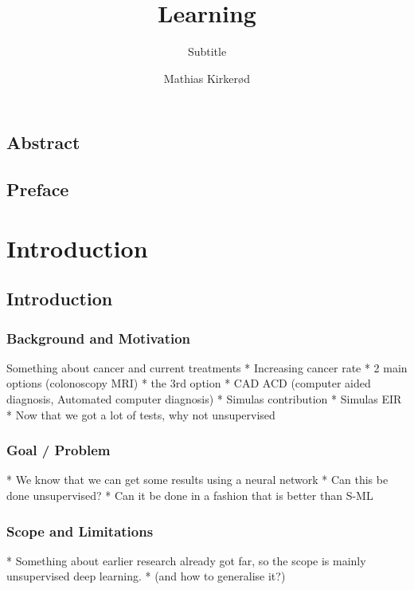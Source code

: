 \documentclass[a4paper,english]{ifimaster}
\title{Learning}
\subtitle{Subtitle}
\author{Mathias Kirkerød}
\begin{document}
\duoforside[dept={Department of Informatics},
program={Informatics: Language and Communication},
long]

\frontmatter{}
\chapter*{Abstract}

\tableofcontents{}
\listoffigures{}
\listoftables{}

\chapter*{Preface}

\mainmatter{}






















\part{Introduction}
\chapter{Introduction}
	\section{Background and Motivation}
		Something about cancer and current treatments 
		* Increasing cancer rate
		* 2 main options (colonoscopy MRI)
		* the 3rd option
		* CAD ACD (computer aided diagnosis, Automated computer diagnosis)
		* Simulas contribution
		* Simulas EIR
		* Now that we got a lot of tests, why not unsupervised
	
	\section{Goal / Problem}
		* We know that we can get some results using a neural network
		* Can this be done unsupervised?
		* Can it be done in a fashion that is better than S-ML
		 
		
		
	\section{Scope and Limitations}
		* Something about earlier research already got far, so the scope is mainly unsupervised deep learning.
		* (and how to generalise it?)
		
\end{document}
